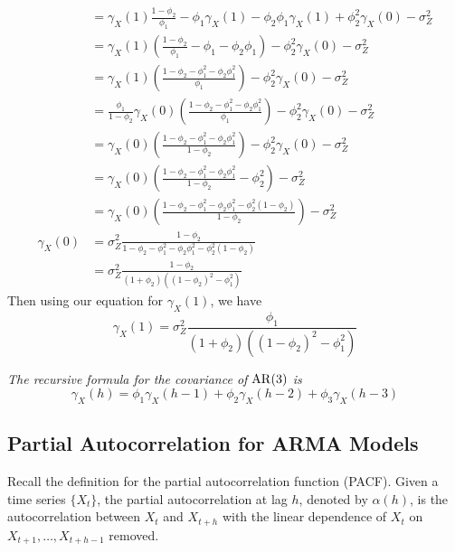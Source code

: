 \begin{example}[AR(2)]
{\begin{align*}
            &= \gamma_X(1)\frac{1-\phi_2}{\phi_1} - \phi_1\gamma_X(1) - \phi_2\phi_1\gamma_X(1) + \phi_2^2\gamma_X(0) - \sigma_Z^2\\
            &= \gamma_X(1)\left(\frac{1-\phi_2}{\phi_1} - \phi_1 - \phi_2\phi_1\right) - \phi_2^2\gamma_X(0) - \sigma_Z^2\\
            &= \gamma_X(1)\left(\frac{1-\phi_2 -\phi_1^2 - \phi_2\phi_1^2}{\phi_1}\right) - \phi_2^2\gamma_X(0) - \sigma_Z^2\\
            &= \frac{\phi_1}{1-\phi_2}\gamma_X(0)\left(\frac{1-\phi_2 -\phi_1^2 - \phi_2\phi_1^2}{\phi_1}\right) - \phi_2^2\gamma_X(0) - \sigma_Z^2\\
            &= \gamma_X(0)\left(\frac{1-\phi_2-\phi_1^2 - \phi_2\phi_1^2}{1-\phi_2}\right) - \phi_2^2\gamma_X(0) - \sigma_Z^2\\
            &= \gamma_X(0)\left(\frac{1-\phi_2 -\phi_1^2-\phi_2\phi_1^2}{1-\phi_2} - \phi_2^2\right) - \sigma_Z^2\\
            &= \gamma_X(0)\left(\frac{1-\phi_2-\phi_1^2-\phi_2\phi_1^2-\phi_2^2(1-\phi_2)}{1-\phi_2}\right) - \sigma_Z^2\\
            \gamma_X(0) &= \sigma_Z^2 \frac{1-\phi_2}{1-\phi_2-\phi_1^2-\phi_2\phi_1^2-\phi_2^2(1-\phi_2)}\\
                        &= \sigma_Z^2 \frac{1-\phi_2}{(1+\phi_2)((1-\phi_2)^2 - \phi_1^2)}
        \end{align*}
        Then using our equation for $\gamma_X(1)$, we have
        \[\gamma_X(1) = \sigma_Z^2 \frac{\phi_1}{(1+\phi_2)((1-\phi_2)^2 - \phi_1^2)}\]
    }    
\end{example}

\begin{example}[AR(3)]
    \emph{The recursive formula for the covariance of $\operatorname{AR}(3)$ is}
    \[\gamma_X(h) = \phi_1\gamma_X(h-1) + \phi_2\gamma_X(h-2) + \phi_3\gamma_X(h-3)\]
\end{example}

\subsection{Partial Autocorrelation for ARMA Models}

Recall the definition for the partial autocorrelation function (PACF). Given a time series $\{X_t\}$, the partial autocorrelation at lag $h$, denoted by $\alpha(h)$, is the autocorrelation between $X_t$ and $X_{t+h}$ with the linear dependence of $X_t$ on $X_{t+1}, \ldots, X_{t+h-1}$ removed.


